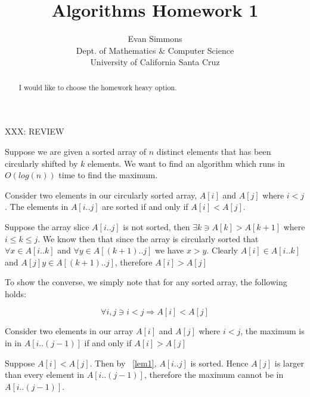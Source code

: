 \documentclass{amsart}
\theoremstyle{definition}
\theoremstyle{remark}
\numberwithin{equation}{section}
\begin{document}
\title[]{Algorithms Homework 1}%
\author{Evan Simmons \\
        Dept. of Mathematics \& Computer Science \\ University of California Santa Cruz}%
\renewcommand{\abstractname}{Homework Option}
\begin{abstract}
I would like to choose the homework heavy option.
\end{abstract}
\maketitle

\section{} 
XXX: REVIEW

Suppose we are given a sorted array of $n$ distinct elements
that has been circularly shifted by $k$ elements. We want to find an
algorithm which runs in $O(log(n))$ time to find the maximum.

\lem \label{lem1}

Consider two elements in our circularly sorted array, $A[i]$ and $A[j]$
where $i < j$. The elements in $A[i..j]$ are sorted if
and only if $A[i] < A[j]$.

\proof{} 

Suppose the array slice $A[i..j]$ is not sorted, then $\exists k \ni
A[k] > A[k+1]$ where $i \leq k \leq j$. We know then that since the
array is circularly sorted that $\forall x \in A[i..k]$ and $\forall y
\in A[(k+1)..j]$ we have $x > y$. Clearly $A[i] \in A[i..k]$ and $A[j] y
\in A[(k+1)..j]$, therefore $A[i] > A[j]$

To show the converse, we simply note that for any sorted array, the
following holds:

$$ \forall i,j \ni i<j \Rightarrow A[i] < A[j] $$

\cor \label{cor1}

Consider two elements in our array $A[i]$ and $A[j]$ where $i<j$, the maximum
is in in $A[i..(j-1)]$ if and only if $A[i] > A[j]$

\proof 

Suppose $A[i] < A[j]$. Then by ~\ref{lem1}, $A[i..j]$ is sorted. Hence
$A[j]$ is larger than every element in $A[i..(j-1)]$, therefore the maximum
cannot be in $A[i..(j-1)]$.
\end{document}

